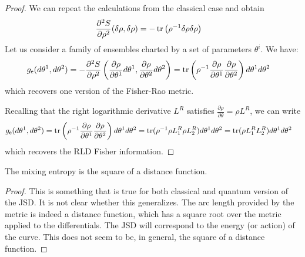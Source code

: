 \begin{proof}
	We can repeat the calculations from the classical case and obtain
	\begin{equation}
	\begin{aligned}
		\frac{\partial^2 S}{\partial \rho^2}(\delta \rho, \delta \rho) &= - \operatorname{tr}\left(\rho^{-1} \delta \rho \delta \rho \right)
	\end{aligned}
\end{equation}
	Let us consider a family of ensembles charted by a set of parameters $\theta^i$. We have:
\begin{equation}
	\begin{aligned}
		g_{\mathsf{e}}(d\theta^1, d\theta^2) &= - \frac{\partial^2 S}{\partial \rho^2}\left(\frac{\partial 
			\rho}{\partial \theta^1} d\theta^1, \frac{\partial 
			\rho}{\partial \theta^2} d\theta^2\right) = \operatorname{tr}\left( \rho^{-1} \frac{\partial \rho}{\partial \theta^1 }\frac{\partial \rho}{\partial \theta^2}\right) d\theta^1 d\theta^2
	\end{aligned}
\end{equation}
which recovers one version of the Fisher-Rao metric.

Recalling that the right logarithmic derivative $L^R$ satisfies $\frac{\partial \rho}{\partial \theta} = \rho L^R$, we can write 
	\begin{equation}
	\begin{aligned}
	g_{\mathsf{e}}(d\theta^1, d\theta^2) &= \operatorname{tr}\left( \rho^{-1} \frac{\partial \rho}{\partial \theta^1 }\frac{\partial \rho}{\partial \theta^2}\right) d\theta^1 d\theta^2 = \operatorname{tr}(\rho^{-1}\rho L^R
	_1 \rho L^R_2)d\theta^1 d\theta^2 = \operatorname{tr}(\rho L^R
	_1 L^R_2)d\theta^1 d\theta^2
\end{aligned}
	\end{equation}
which recovers the RLD Fisher information.
\end{proof}

\begin{conj}
	The mixing entropy is the square of a distance function.
\end{conj}

\begin{proof}
	This is something that is true for both classical and quantum version of the JSD. It is not clear whether this generalizes. The arc length provided by the metric is indeed a distance function, which has a square root over the metric applied to the differentials. The JSD will correspond to the energy (or action) of the curve. This does not seem to be, in general, the square of a distance function.
\end{proof}

